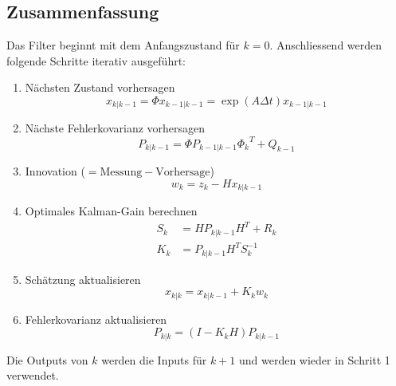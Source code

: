 \subsection{Zusammenfassung }
Das Filter beginnt mit dem Anfangszustand für $k=0$.
Anschliessend werden folgende Schritte iterativ ausgeführt:
\begin{enumerate}
\item Nächsten Zustand vorhersagen
\[
{x_{k|k-1}}=\Phi{x_{k-1|k-1}}= \exp(A\Delta t){x_{k-1|k-1}}
\] 

 \item Nächste Fehlerkovarianz vorhersagen
\[
{P_{k|k-1}}=\Phi {P_{k-1|k-1}} {\Phi _{k}}^T + {Q_{k-1}}
\] 

\item Innovation ($= \text{Messung} - \text{Vorhersage}$)
\[
{w_{k}}={z_{k}}-{H}{x_{k|k-1}}
\] 

\item Optimales Kalman-Gain berechnen
\begin{align*}
{S_{k}} &={H}{P_{k|k-1}}{H}^T+{R_{k}}\\
{K_{k}} &= {P_{k|k-1}} {H^T}{S_{k}^{-1}}
\end{align*}

\item Schätzung aktualisieren
\[
{x_{k|k}}={x_{k|k-1}}+{K_{k}}{w_{k}}
\] 

\item Fehlerkovarianz aktualisieren
\[
{P_{k|k}}=(I-{K_{k}}{H}){P_{k|k-1}}
\] 

\end{enumerate}
Die Outputs von $k$ werden die Inputs für ${k+1}$ und werden wieder in Schritt 1 verwendet.

